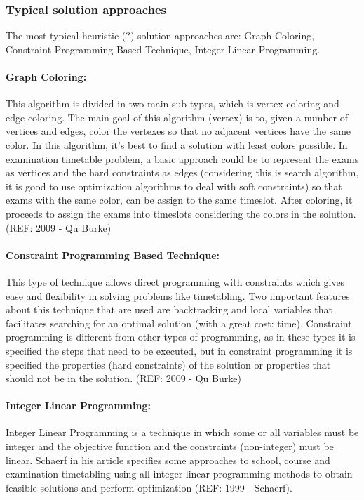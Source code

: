 \subsubsection{Typical solution approaches}
\label{subsection:TypSolutionsApp}
The most typical heuristic (?) solution approaches are: Graph Coloring, Constraint Programming Based Technique, Integer Linear Programming.\\

\paragraph{Graph Coloring:}
This algorithm is divided in two main sub-types, which is vertex coloring and edge coloring. The main goal of this algorithm (vertex) is to, given a number of vertices and edges, color the vertexes so that no adjacent vertices have the same color. In this algorithm, it's best to find a solution with least colors possible. In examination timetable problem, a basic approach could be to represent the exams as vertices and the hard constraints as edges (considering this is search algorithm, it is good to use optimization algorithms to deal with soft constraints) so that exams with the same color, can be assign to the same timeslot. After coloring, it proceeds to assign the exams into timeslots considering the colors in the solution. (REF: 2009 - Qu Burke)

\paragraph{Constraint Programming Based Technique:}
This type of technique allows direct programming with constraints which gives ease and flexibility in solving problems like timetabling. Two important features about this technique that are used are backtracking and local variables that facilitates searching for an optimal solution (with a great cost: time). Constraint programming is different from other types of programming, as in these types it is specified the steps that need to be executed, but in constraint programming it is specified the properties (hard constraints) of the solution or properties that should not be in the solution. (REF: 2009 - Qu Burke)

\paragraph{Integer Linear Programming:}
Integer Linear Programming is a technique in which some or all variables must be integer and the objective function and the constraints (non-integer) must be linear. Schaerf in his article specifies some approaches to school, course and examination timetabling using all integer linear programming methods to obtain feasible solutions and perform optimization (REF: 1999 - Schaerf).









